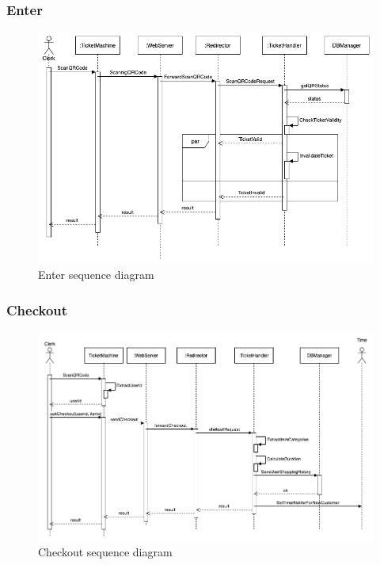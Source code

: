 \subsubsection{Enter}
\begin{figure}[H]
  \centering
  \includegraphics[width=\textwidth, keepaspectratio]{images/sequences/Enter.png}
  \caption{Enter sequence diagram}
\end{figure}
\vspace{2cm}


\subsubsection{Checkout}
\begin{figure}[H]
  \centering
  \includegraphics[width=\textwidth, keepaspectratio]{images/sequences/Checkout.png}
  \caption{Checkout sequence diagram}
\end{figure}
\vspace{2cm}

